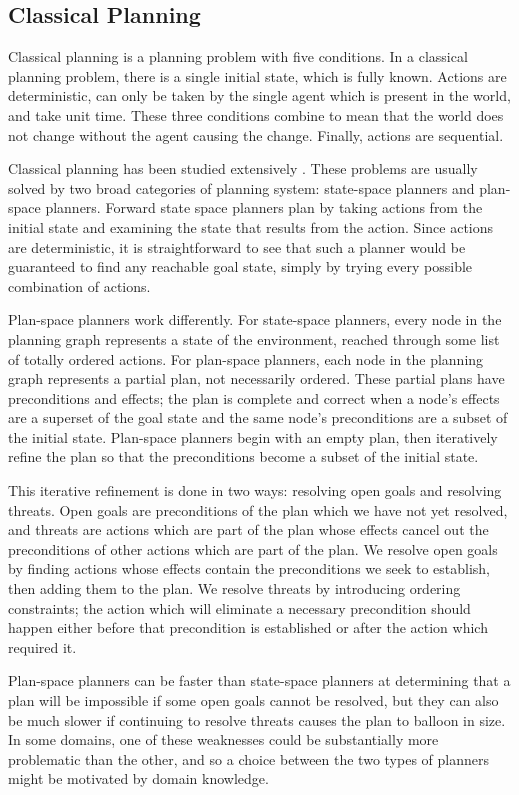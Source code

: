 \subsection{Classical Planning}
Classical planning is a planning problem with five conditions.  In a classical planning problem,
there is a single initial state, which is fully known.  Actions are deterministic, can only
be taken by the single agent which is present in the world, and take unit time.  These three
conditions combine to mean that the world does not change without the agent causing the change.
Finally, actions are sequential.

Classical planning has been studied extensively \cite{ghallab2004automated}.  These problems are usually solved by two broad categories of
planning system: state-space planners and plan-space planners.  Forward state space planners
plan by taking actions from the initial state and examining the state that results from the action.  Since
actions are deterministic, it is straightforward to see that such a planner would be guaranteed to find
any reachable goal state, simply by trying every possible combination of actions.

Plan-space planners work differently.  For state-space planners, every node in the planning graph
represents a state of the environment, reached through some list of totally ordered actions.  For plan-space
planners, each node in the planning graph represents a partial plan, not necessarily ordered.  These partial plans
have preconditions and effects; the plan is complete and correct when a node's effects are a superset
of the goal state and the same node's preconditions are a subset of the initial state.  Plan-space
planners begin with an empty plan, then
iteratively refine the plan so that the preconditions become a subset of the initial state.

This iterative refinement is done in two ways: resolving open goals and resolving threats.
Open goals are preconditions of the plan which we have not yet resolved, and threats are
actions which are part of the plan whose effects cancel out the
preconditions of other actions which are part of the plan.  We resolve open goals by finding
actions whose effects contain the preconditions we seek to establish, then adding them to
the plan.  We resolve threats by introducing ordering constraints; the action which will
eliminate a necessary precondition should happen either before that precondition is established
or after the action which required it.

Plan-space planners can be faster than state-space planners at determining that a plan will be
impossible if some open goals cannot be resolved, but they can also be much slower if
continuing to resolve threats causes the plan to balloon in size.  In some domains, one of
these weaknesses could be substantially more problematic than the other, and so a choice between the
two types of planners might be motivated by domain knowledge.


